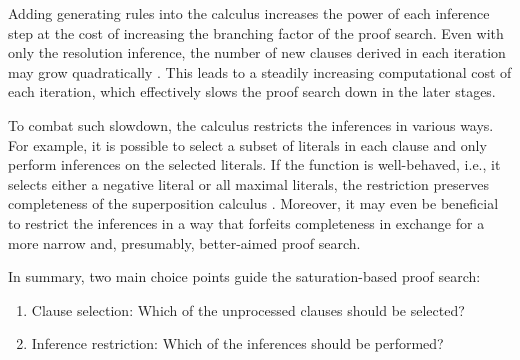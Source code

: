 Adding generating rules into the calculus increases the power of each inference step at the cost of increasing the branching factor of the proof search.
Even with only the resolution inference, the number of new clauses derived in each iteration may grow quadratically \cite{}.
This leads to a steadily increasing computational cost of each iteration,
which effectively slows the proof search down in the later stages.


To combat such slowdown, the calculus restricts the inferences in various ways.
For example, it is possible to select a subset of literals in each clause and only perform inferences on the selected literals.
If the  function is well-behaved,
i.e., it selects either a negative literal or all maximal literals,
the restriction preserves completeness of the superposition calculus \cite{DBLP:journals/logcom/BachmairG94}.
Moreover, it may even be beneficial to restrict the inferences in a way that forfeits completeness
in exchange for a more narrow and, presumably, better-aimed proof search.

In summary, two main choice points guide the \gls{saturation}-based proof search:
\begin{enumerate}
\item Clause selection: Which of the unprocessed clauses should be selected?
\item Inference restriction: Which of the inferences should be performed?
\end{enumerate}

